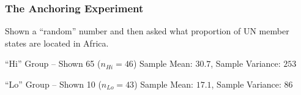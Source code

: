 \documentclass[handout]{beamer}
\begin{document}
\begin{frame}
\frametitle{The Anchoring Experiment}
Shown a ``random'' number and then asked what proportion of UN member states are located in Africa.
	\begin{block}{``Hi'' Group -- Shown 65 ($n_{Hi}=46$)}
		Sample Mean: $30.7$, Sample Variance: $253$
\end{block}


	\begin{block}{``Lo'' Group -- Shown 10 ($n_{Lo}=43$)}
	Sample Mean: $17.1$, Sample Variance: $86$
\end{block}


\vspace{1em}

\hfill\alert{}
\end{frame}
\end{document}
